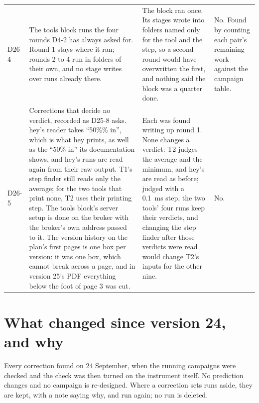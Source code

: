 \documentclass[11pt]{article}
\begin{document}
{\begin{longtable}{@{}p{1.1cm} >{\raggedright\arraybackslash}p{6.1cm} >{\raggedright\arraybackslash}p{6.0cm} >{\raggedright\arraybackslash}p{2.2cm}@{}}
D26-4 & The tools block runs the four rounds D4-2 has always asked for. Round 1 stays where it ran; rounds 2 to 4 run in folders of their own, and no stage writes over runs already there. & The block ran once. Its stages wrote into folders named only for the tool and the step, so a second round would have overwritten the first, and nothing said the block was a quarter done. & No. Found by counting each pair's remaining work against the campaign table. \\
D26-5 & Corrections that decide no verdict, recorded as D25-8 asks. hey's reader takes ``50\%\% in'', which is what hey prints, as well as the ``50\% in'' its documentation shows, and hey's runs are read again from their raw output. T1's step finder still reads only the average; for the two tools that print none, T2 uses their printing step. The tools block's server setup is done on the broker with the broker's own address passed to it. The version history on the plan's first pages is one box per version: it was one box, which cannot break across a page, and in version 25's PDF everything below the foot of page 3 was cut. & Each was found writing up round 1. None changes a verdict: T2 judges the average and the minimum, and hey's are read as before; judged with a 0.1~ms step, the two tools' four runs keep their verdicts, and changing the step finder after those verdicts were read would change T2's inputs for the other nine. & No. \\
\bottomrule
\end{longtable}}

\section*{What changed since version 24, and why}
Every correction found on 24 September, when the running campaigns were checked and the check
was then turned on the instrument itself. No prediction changes and no campaign is re-designed.
Where a correction sets runs aside, they are kept, with a note saying why, and run again; no
run is deleted.
\end{document}
